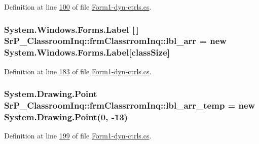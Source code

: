 \-Definition at line \hyperlink{_form1-dyn-ctrls_8cs_source_l00100}{100} of file \hyperlink{_form1-dyn-ctrls_8cs_source}{\-Form1-\/dyn-\/ctrls.\-cs}.

\hypertarget{class_sr_p___classroom_inq_1_1frm_classrrom_inq_a7f0a5f5fff7a87e841b2793f89dcd997}{
\subsubsection[{lbl\-\_\-arr}]{\setlength{\rightskip}{0pt plus 5cm}\-System.\-Windows.\-Forms.\-Label \mbox{[}$\,$\mbox{]} {\bf \-Sr\-P\-\_\-\-Classroom\-Inq\-::frm\-Classrrom\-Inq\-::lbl\-\_\-arr} = new \-System.\-Windows.\-Forms.\-Label\mbox{[}{\bf class\-Size}\mbox{]}}}
\label{class_sr_p___classroom_inq_1_1frm_classrrom_inq_a7f0a5f5fff7a87e841b2793f89dcd997}


\-Definition at line \hyperlink{_form1-dyn-ctrls_8cs_source_l00183}{183} of file \hyperlink{_form1-dyn-ctrls_8cs_source}{\-Form1-\/dyn-\/ctrls.\-cs}.

\hypertarget{class_sr_p___classroom_inq_1_1frm_classrrom_inq_ae3405b23105270490b9685ac52e1b574}{
\subsubsection[{lbl\-\_\-arr\-\_\-temp}]{\setlength{\rightskip}{0pt plus 5cm}\-System.\-Drawing.\-Point {\bf \-Sr\-P\-\_\-\-Classroom\-Inq\-::frm\-Classrrom\-Inq\-::lbl\-\_\-arr\-\_\-temp} = new \-System.\-Drawing.\-Point(0, -\/13)}}
\label{class_sr_p___classroom_inq_1_1frm_classrrom_inq_ae3405b23105270490b9685ac52e1b574}


\-Definition at line \hyperlink{_form1-dyn-ctrls_8cs_source_l00199}{199} of file \hyperlink{_form1-dyn-ctrls_8cs_source}{\-Form1-\/dyn-\/ctrls.\-cs}.


